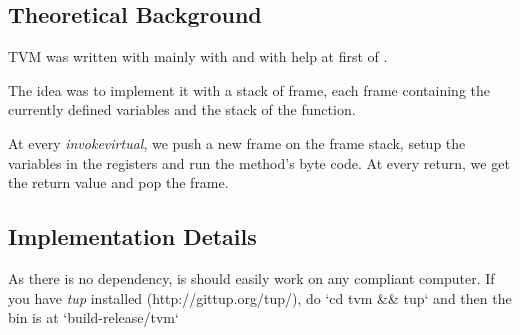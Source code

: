 %
%
%

\subsection{Theoretical Background}
TVM was written with mainly with \cite{Spec} and with help at first of
\cite{Wiki}.

The idea was to implement it with a stack of frame, each frame containing the
currently defined variables and the stack of the function.

At every \emph{invokevirtual}, we push a new frame on the frame stack, setup the
variables in the registers and run the method's byte code. At every return, we
get the return value and pop the frame.

\subsection{Implementation Details}
As there is no dependency, is should easily work on any compliant computer.
If you have \emph{tup} installed (http://gittup.org/tup/), do
`cd tvm \&\& tup` and then the bin is at `build-release/tvm`

